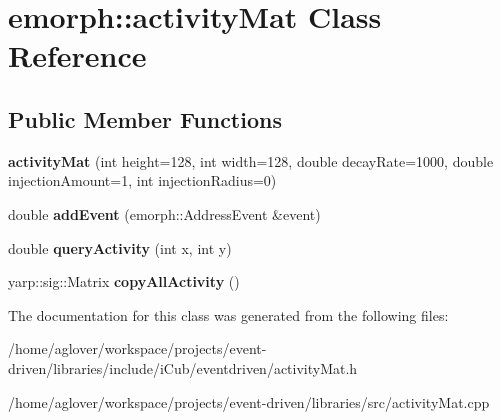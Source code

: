 \hypertarget{classemorph_1_1activityMat}{}\section{emorph\+:\+:activity\+Mat Class Reference}
\label{classemorph_1_1activityMat}
\subsection*{Public Member Functions}
\begin{DoxyCompactItemize}
\item 
{\bfseries activity\+Mat} (int height=128, int width=128, double decay\+Rate=1000, double injection\+Amount=1, int injection\+Radius=0)\hypertarget{classemorph_1_1activityMat_aa691fac5518d0aebbf478ca608c0eea5}{}\label{classemorph_1_1activityMat_aa691fac5518d0aebbf478ca608c0eea5}

\item 
double {\bfseries add\+Event} (emorph\+::\+Address\+Event \&event)\hypertarget{classemorph_1_1activityMat_a6d9bad36055b34b570b9e95ba7db3e8d}{}\label{classemorph_1_1activityMat_a6d9bad36055b34b570b9e95ba7db3e8d}

\item 
double {\bfseries query\+Activity} (int x, int y)\hypertarget{classemorph_1_1activityMat_a017a37a8eaba4b23acbc7e8a8f5de528}{}\label{classemorph_1_1activityMat_a017a37a8eaba4b23acbc7e8a8f5de528}

\item 
yarp\+::sig\+::\+Matrix {\bfseries copy\+All\+Activity} ()\hypertarget{classemorph_1_1activityMat_a8bd6d788a299ebaf8da6dd0ccfb5ddb3}{}\label{classemorph_1_1activityMat_a8bd6d788a299ebaf8da6dd0ccfb5ddb3}

\end{DoxyCompactItemize}


The documentation for this class was generated from the following files\+:\begin{DoxyCompactItemize}
\item 
/home/aglover/workspace/projects/event-\/driven/libraries/include/i\+Cub/eventdriven/activity\+Mat.\+h\item 
/home/aglover/workspace/projects/event-\/driven/libraries/src/activity\+Mat.\+cpp\end{DoxyCompactItemize}
